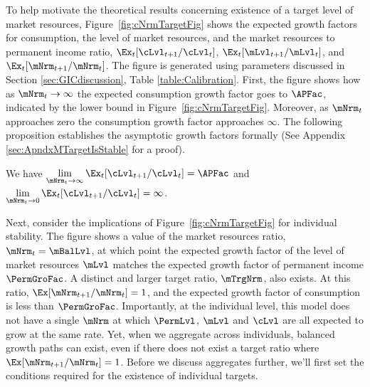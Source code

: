 \documentclass[BufferStockTheory]{subfiles}
\begin{document}
\begin{comment}
Should we say normalized market resources above?
\end{comment}

To help motivate the theoretical results concerning existence of a target level of market resources, Figure~\ref{fig:cNrmTargetFig} shows the expected growth factors for consumption, the level of market resources, and the market resources to permanent income ratio, $\Ex_{t}[\cLvl_{t+1}/\cLvl_{t}]$, $\Ex_{t}[\mLvl_{t+1}/\mLvl_{t}]$, and $\Ex_{t}[\mNrm_{t+1}/\mNrm_{t}]$. The figure is generated using parameters discussed in Section \ref{sec:GICdiscussion}, Table \ref{table:Calibration}. First, the figure shows how as $\mNrm_{t} \rightarrow \infty$ the expected consumption growth factor goes to ${\APFac}$, indicated by the lower bound in Figure~\ref{fig:cNrmTargetFig}.  Moreover, as $\mNrm_{t}$ approaches zero the consumption growth factor approaches $\infty$. The following proposition establishes the asymptotic growth factors formally (See Appendix \ref{sec:ApndxMTargetIsStable} for a proof).

\begin{proposition}\label{prop:convgGrowth}
We have $\lim\limits_{\mNrm_{t} \rightarrow \infty} \Ex_{t}[\cLvl_{t+1}/\cLvl_{t}] =  {\APFac}$ and $\lim\limits_{\mNrm_{t} \rightarrow  0} \Ex_{t}[\cLvl_{t+1}/\cLvl_{t}] =  \infty$. 
\end{proposition}

Next, consider the implications of Figure~\ref{fig:cNrmTargetFig} for individual stability. The figure shows a value of the market resources ratio, $\mNrm_{t} = \mBalLvl$, at which point the expected growth factor of the level of market resources $\mLvl$ matches the expected growth factor of permanent income $\PermGroFac$. A distinct and larger target ratio, $\mTrgNrm$, also exists. At this ratio, $\Ex[\mNrm_{t+1}/\mNrm_{t}]=1$, and the expected growth factor of consumption is less than $\PermGroFac$.  Importantly, at the individual level, this model does not have a single $\mNrm$ at which $\PermLvl$, $\mLvl$ and $\cLvl$ are all expected to grow at the same rate. Yet, when we aggregate across individuals, balanced growth paths can exist, even if there does not exist a target ratio where $\Ex[\mNrm_{t+1}/\mNrm_{t}]=1$. Before we discuss aggregates further, we'll first set the conditions required for the existence of individual targets. 
\end{document}

